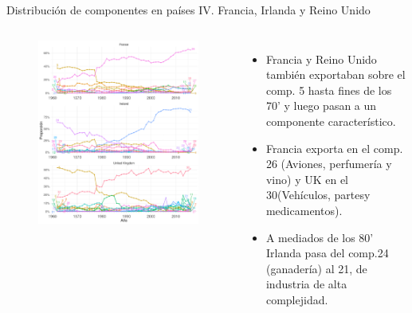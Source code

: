 \documentclass[compress]{beamer}
\begin{document}
\begin{frame}
\small
Distribución de componentes en países IV. Francia, Irlanda y Reino Unido
\scriptsize
\begin{columns}[c] 
	
	\begin{figure}
		\includegraphics[width=\linewidth]{graficoLDA_k30_FRA_GBR_IRL}
	\end{figure}
	
	
	\begin{itemize}[label=\faRebel]
		\item Francia y Reino Unido también exportaban sobre el comp. 5 hasta fines de los 70' y luego pasan a un componente característico.
		\item Francia exporta en el comp. 26 (Aviones, perfumería y vino) y UK en el 30(Vehículos, partesy medicamentos).
		\item A mediados de los 80' Irlanda pasa del comp.24 (ganadería) al 21, de industria de alta complejidad.
	\end{itemize}
	
\end{columns} 

\end{frame}
\end{document}
